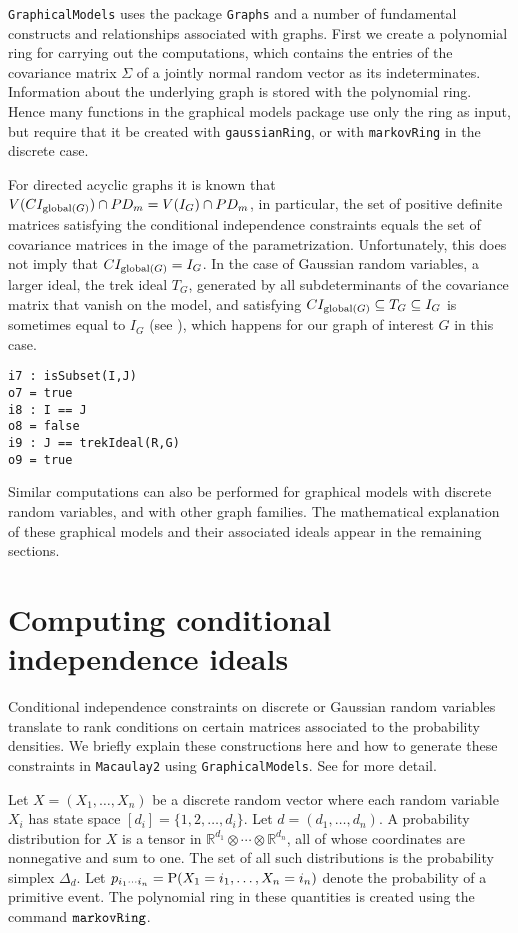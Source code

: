 \documentclass[letterpaper]{article}
\theoremstyle{definition}
\begin{document}
 {\tt GraphicalModels} uses the package {\tt Graphs} and a number of fundamental constructs and relationships 
associated with graphs.  First we create a polynomial ring
for carrying out the computations, which contains the entries of
the covariance matrix $\Sigma$ of a jointly normal random vector
as its indeterminates.  Information about the underlying graph is stored with the polynomial ring. 
Hence many functions in the graphical models package use only the ring as input, but require that it be created with {\tt gaussianRing}, or with {\tt markovRing} in the discrete case.

For directed acyclic graphs it is known that 
$V(CI_{{\rm global}(G)}) \cap PD_{m}  =  
V(I_{G}) \cap PD_{m}$,
in particular, the set of positive definite matrices
satisfying the conditional independence constraints equals the set of covariance matrices in the image of the parametrization.
Unfortunately, this does not imply that $CI_{{\rm global}(G)} 
=I_{G}$.  In the case of Gaussian random variables, a larger ideal,
the trek ideal $T_{G}$, generated by all subdeterminants of the 
covariance matrix that vanish on the model, and satisfying
$CI_{{\rm global}(G)} \subseteq T_{G} \subseteq
I_{G}$ is sometimes equal to $I_{G}$ (see \cite{STD}), which happens for our
graph of interest $G$ in this case.

\begin{verbatim}
i7 : isSubset(I,J)
o7 = true
i8 : I == J
o8 = false
i9 : J == trekIdeal(R,G)
o9 = true
\end{verbatim}

Similar computations can also be performed for graphical models
with discrete random variables,
and with other graph families.  The mathematical explanation of
these graphical models and their associated ideals
appear in the remaining sections.


\section{Computing conditional independence ideals}\label{CI}

Conditional independence constraints on discrete or Gaussian random variables
 translate to rank conditions on certain matrices
associated to the probability densities.  We briefly explain
these constructions here and how to generate these constraints
in {\tt Macaulay2} using {\tt GraphicalModels}. See \cite[Ch.~3]{DSS}
for more detail.

Let $X = (X_{1}, \ldots, X_{n})$ be a discrete random
vector where each random variable $X_{i}$ has state space
$[d_{i}] = \{1,2, \ldots, d_{i} \}$. Let $d = (d_{1}, \ldots, d_{n})$.  
A probability distribution
for $X$ is a tensor in $\mathbb{R}^{d_{1}}\otimes \cdots \otimes
\mathbb{R}^{d_{n}}$, all of whose 
coordinates are nonnegative and sum to one.
The set of all such distributions is the probability simplex $\Delta_{d}$.
Let $p_{i_{1}\cdots i_{n}} = {\rm P}(X_{1} = i_{1}, \ldots, X_{n} = i_{n})$
denote the probability of a primitive event.  The polynomial
ring in these quantities is created using the command ${\tt markovRing}$.
\end{document}

